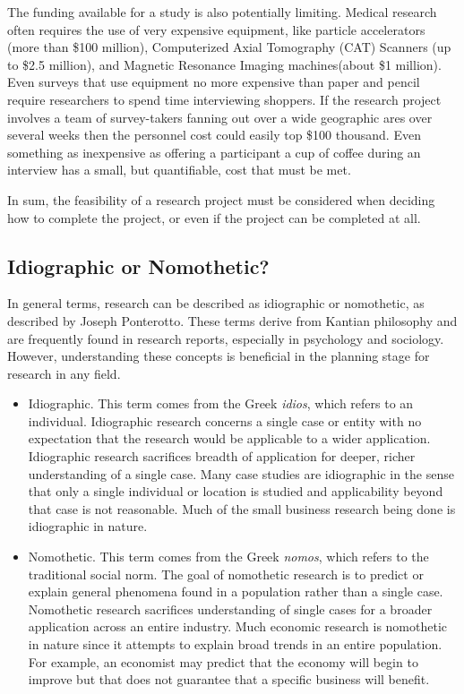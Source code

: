The funding available for a study is also potentially limiting. Medical research often requires the use of very expensive equipment, like particle accelerators (more than \$100 million), Computerized Axial Tomography (CAT) Scanners (up to \$2.5 million), and Magnetic Resonance Imaging machines(about \$1 million). Even surveys that use equipment no more expensive than paper and pencil require researchers to spend time interviewing shoppers. If the research project involves a team of survey-takers fanning out over a wide geographic ares over several weeks then the personnel cost could easily top \$100 thousand. Even something as inexpensive as offering a participant a cup of coffee during an interview has a small, but quantifiable, cost that must be met.

In sum, the feasibility of a research project must be considered when deciding how to complete the project, or even if the project can be completed at all.

\subsection{Idiographic or Nomothetic?}

In general terms, research can be described as \gls{idiographic} or \gls{nomothetic}, as described by Joseph Ponterotto\cite{ponterotto2005qualitative}. These terms derive from Kantian philosophy and are frequently found in research reports, especially in psychology and sociology. However, understanding these concepts is beneficial in the planning stage for research in any field.

\begin{itemize}
	\item Idiographic. This term comes from the Greek \textit{idios}, which refers to an individual. Idiographic research concerns a single case or entity with no expectation that the research would be applicable to a wider application. Idiographic research sacrifices breadth of application for deeper, richer understanding of a single case. Many case studies are idiographic in the sense that only a single individual or location is studied and applicability beyond that case is not reasonable. Much of the small business research being done is idiographic in nature.
	\item Nomothetic. This term comes from the Greek \textit{nomos}, which refers to the traditional social norm. The goal of nomothetic research is to predict or explain general phenomena found in a population rather than a single case. Nomothetic research sacrifices understanding of single cases for a broader application across an entire industry. Much economic research is nomothetic in nature since it attempts to explain broad trends in an entire population. For example, an economist may predict that the economy will begin to improve but that does not guarantee that a specific business will benefit.
\end{itemize}

